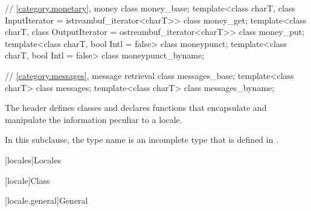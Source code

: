\begin{codeblock}
{  // \ref{category.monetary}, money
  class money_base;
  template<class charT, class InputIterator = istreambuf_iterator<charT>>
    class money_get;
  template<class charT, class OutputIterator = ostreambuf_iterator<charT>>
    class money_put;
  template<class charT, bool Intl = false>
    class moneypunct;
  template<class charT, bool Intl = false>
    class moneypunct_byname;

  // \ref{category.messages}, message retrieval
  class messages_base;
  template<class charT> class messages;
  template<class charT> class messages_byname;
}
\end{codeblock}

\pnum
The header 
defines classes and declares functions
that encapsulate and manipulate the information peculiar to a locale.
\begin{footnote}
In this subclause, the type name 
is an incomplete type that is defined in .
\end{footnote}

[locales]{Locales}

[locale]{Class }

[locale.general]{General}

